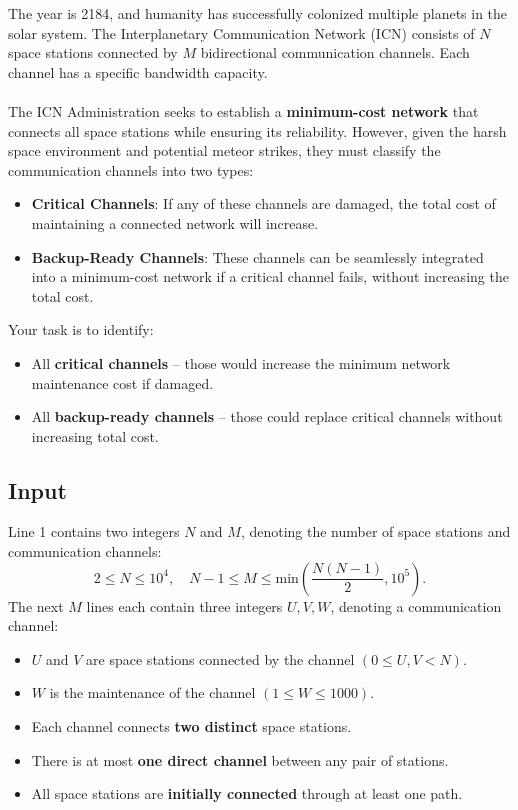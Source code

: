\documentclass[12pt,a4paper]{article}
\begin{document}
\noindent
The year is 2184, and humanity has successfully colonized multiple planets in the solar system. The Interplanetary Communication Network (ICN) consists of \( N \) space stations connected by \( M \) bidirectional communication channels. Each channel has a specific bandwidth capacity.
\\\\
\noindent
The ICN Administration seeks to establish a \textbf{minimum-cost network} that connects all space stations while ensuring its reliability. However, given the harsh space environment and potential meteor strikes, they must classify the communication channels into two types:

\begin{itemize}
    \item \textbf{Critical Channels}: If any of these channels are damaged, the total cost of maintaining a connected network will increase.
    \item \textbf{Backup-Ready Channels}: These channels can be seamlessly integrated into a minimum-cost network if a critical channel fails, without increasing the total cost.
\end{itemize}

\noindent
Your task is to identify:
\begin{itemize}
    \item All \textbf{critical channels } -- those would increase the minimum network maintenance cost if damaged.
    \item All \textbf{backup-ready channels }-- those could replace critical channels without increasing total cost.
\end{itemize}

\subsection*{\fontsize{16}{12}Input}
Line 1 contains two integers \( N \) and \( M \), denoting the number of space stations and communication channels:
    \[
    2 \leq N \leq 10^4, \quad N-1 \leq M \leq \text{min}(\frac{N(N-1)}{2},10^5).
    \]
\noindent
The next \( M \) lines each contain three integers \( U, V, W \), denoting a communication channel:
    \begin{itemize}
        \item \( U \) and \( V \) are space stations connected by the channel \((0 \leq U, V < N)\).
        \item \( W \) is the maintenance of the channel \((1 \leq W \leq 1000)\).
        \item Each channel connects \textbf{two distinct} space stations.
        \item There is at most \textbf{one direct channel} between any pair of stations.
        \item All space stations are \textbf{initially connected} through at least one path.
    \end{itemize}
\end{document}

